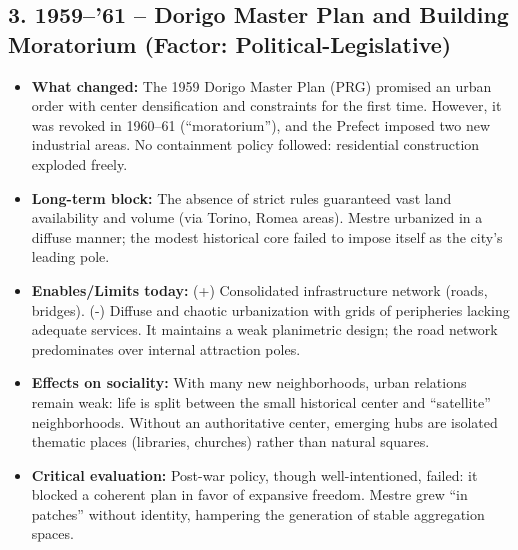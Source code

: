 \documentclass[a4paper,11pt]{article}
\begin{document}
\subsection*{3. 1959--'61 – Dorigo Master Plan and Building Moratorium (Factor: Political-Legislative)}
\begin{itemize}
    \item \textbf{What changed:} The 1959 Dorigo Master Plan (PRG) promised an urban order with center densification and constraints for the first time. However, it was revoked in 1960--61 (``moratorium''), and the Prefect imposed two new industrial areas. No containment policy followed: residential construction exploded freely.
    \item \textbf{Long-term block:} The absence of strict rules guaranteed vast land availability and volume (via Torino, Romea areas). Mestre urbanized in a diffuse manner; the modest historical core failed to impose itself as the city's leading pole.
    \item \textbf{Enables/Limits today:} (+) Consolidated infrastructure network (roads, bridges). (-) Diffuse and chaotic urbanization with grids of peripheries lacking adequate services. It maintains a weak planimetric design; the road network predominates over internal attraction poles.
    \item \textbf{Effects on sociality:} With many new neighborhoods, urban relations remain weak: life is split between the small historical center and ``satellite'' neighborhoods. Without an authoritative center, emerging hubs are isolated thematic places (libraries, churches) rather than natural squares.
    \item \textbf{Critical evaluation:} Post-war policy, though well-intentioned, failed: it blocked a coherent plan in favor of expansive freedom. Mestre grew ``in patches'' without identity, hampering the generation of stable aggregation spaces.
\end{itemize}
\end{document}
